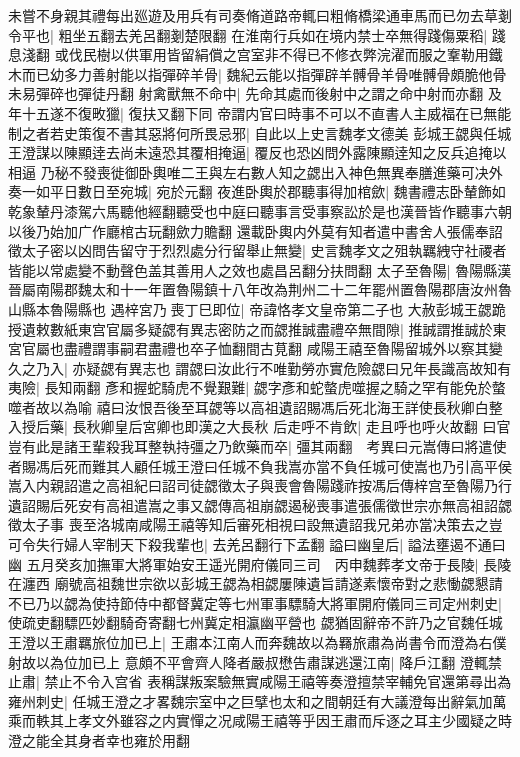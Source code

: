 未嘗不身親其禮每出廵遊及用兵有司奏脩道路帝輒曰粗脩橋梁通車馬而已勿去草剗令平也|{
	粗坐五翻去羌呂翻剗楚限翻}
在淮南行兵如在境内禁士卒無得踐傷粟稻|{
	踐息淺翻}
或伐民樹以供軍用皆留絹償之宫室非不得已不修衣弊浣濯而服之鞌勒用鐵木而已幼多力善射能以指彈碎羊骨|{
	魏紀云能以指彈辟羊髆骨羊骨唯髆骨頗脆他骨未易彈碎也彈徒丹翻}
射禽獸無不命中|{
	先命其處而後射中之謂之命中射而亦翻}
及年十五遂不復畋獵|{
	復扶又翻下同}
帝謂内官曰時事不可以不直書人主威福在已無能制之者若史策復不書其惡將何所畏忌邪|{
	自此以上史言魏孝文德美}
彭城王勰與任城王澄謀以陳顯逹去尚未遠恐其覆相掩逼|{
	覆反也恐凶問外露陳顯逹知之反兵追掩以相逼}
乃秘不發喪徙御卧輿唯二王與左右數人知之勰出入神色無異奉膳進藥可决外奏一如平日數日至宛城|{
	宛於元翻}
夜進卧輿於郡聽事得加棺歛|{
	魏書禮志卧輦飾如乾象輦丹漆駕六馬聽他經翻聽受也中庭曰聽事言受事察訟於是也漢晉皆作聽事六朝以後乃始加广作廳棺古玩翻歛力贍翻}
還載卧輿内外莫有知者遣中書舍人張儒奉詔徵太子密以凶問告留守于烈烈處分行留舉止無變|{
	史言魏孝文之殂執羈絏守社禝者皆能以常處變不動聲色盖其善用人之效也處昌呂翻分扶問翻}
太子至魯陽|{
	魯陽縣漢晉屬南陽郡魏太和十一年置魯陽鎮十八年改為荆州二十二年罷州置魯陽郡唐汝州魯山縣本魯陽縣也}
遇梓宮乃喪丁巳即位|{
	帝諱恪孝文皇帝第二子也}
大赦彭城王勰跪授遺敕數紙東宫官屬多疑勰有異志密防之而勰推誠盡禮卒無間隙|{
	推誠謂推誠於東宮官屬也盡禮謂事嗣君盡禮也卒子恤翻間古莧翻}
咸陽王禧至魯陽留城外以察其變久之乃入|{
	亦疑勰有異志也}
謂勰曰汝此行不唯勤勞亦實危險勰曰兄年長識高故知有夷險|{
	長知兩翻}
彥和握蛇騎虎不覺艱難|{
	勰字彥和蛇螫虎噬握之騎之罕有能免於螫噬者故以為喻}
禧曰汝恨吾後至耳勰等以高祖遺詔賜馮后死北海王詳使長秋卿白整入授后藥|{
	長秋卿皇后宮卿也即漢之大長秋}
后走呼不肯飲|{
	走且呼也呼火故翻}
曰官豈有此是諸王輩殺我耳整執持彊之乃飲藥而卒|{
	彊其兩翻　考異曰元嵩傳曰將遣使者賜馮后死而難其人顧任城王澄曰任城不負我嵩亦當不負任城可使嵩也乃引高平侯嵩入内親詔遣之高祖紀曰詔司徒勰徵太子與喪會魯陽踐祚按馮后傳梓宫至魯陽乃行遺詔賜后死安有高祖遣嵩之事又勰傳高祖崩勰遏秘喪事遣張儒徵世宗亦無高祖詔勰徵太子事}
喪至洛城南咸陽王禧等知后審死相視曰設無遺詔我兄弟亦當决策去之豈可令失行婦人宰制天下殺我輩也|{
	去羌呂翻行下孟翻}
謚曰幽皇后|{
	謚法壅遏不通曰幽}
五月癸亥加撫軍大將軍始安王遥光開府儀同三司　丙申魏葬孝文帝于長陵|{
	長陵在瀍西}
廟號高祖魏世宗欲以彭城王勰為相勰屢陳遺旨請遂素懷帝對之悲慟勰懇請不已乃以勰為使持節侍中都督冀定等七州軍事驃騎大將軍開府儀同三司定州刺史|{
	使疏吏翻驃匹妙翻騎奇寄翻七州冀定相瀛幽平營也}
勰猶固辭帝不許乃之官魏任城王澄以王肅羈旅位加已上|{
	王肅本江南人而奔魏故以為羇旅肅為尚書令而澄為右僕射故以為位加已上}
意頗不平會齊人降者嚴叔懋告肅謀逃還江南|{
	降戶江翻}
澄輒禁止肅|{
	禁止不令入宫省}
表稱謀叛案驗無實咸陽王禧等奏澄擅禁宰輔免官還第尋出為雍州刺史|{
	任城王澄之才畧魏宗室中之巨擘也太和之間朝廷有大議澄每出辭氣加萬乘而軼其上孝文外雖容之内實憚之况咸陽王禧等乎因王肅而斥逐之耳主少國疑之時澄之能全其身者幸也雍於用翻}
